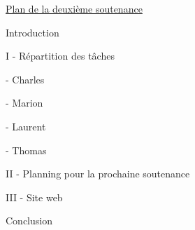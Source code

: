 \documentclass[a4paper]{article}
\begin{document}
\pagestyle{fancy}


\Large

\begin{center}

\underline{Plan de la deuxième soutenance}

\end{center}

\quad

Introduction

\quad
\quad

I - Répartition des tâches

	- Charles


	- Marion


	- Laurent


	- Thomas





\quad
\quad


II  -  Planning pour la prochaine soutenance  

\quad
\quad

III - Site web

\quad
\quad

Conclusion 
\end{document}
